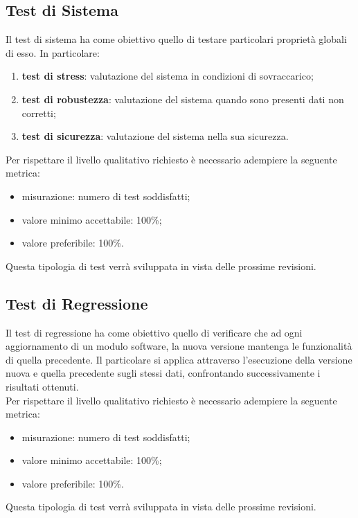 \subsection{Test di Sistema}
Il test di sistema ha come obiettivo quello di testare particolari proprietà globali di esso. In particolare:
\begin{enumerate}
	\item \textbf{test di stress}: valutazione del sistema in condizioni di sovraccarico;
	\item \textbf{test di robustezza}: valutazione del sistema quando sono presenti dati non corretti;
	\item \textbf{test di sicurezza}: valutazione del sistema nella sua sicurezza.
\end{enumerate}
Per rispettare il livello qualitativo richiesto è necessario adempiere la seguente metrica:
\begin{itemize}
\item misurazione: numero di test soddisfatti;
\item valore minimo accettabile: 100\%;
\item valore preferibile: 100\%.
\end{itemize}
Questa tipologia di test verrà sviluppata in vista delle prossime revisioni.


\subsection{Test di Regressione}
Il test di regressione ha come obiettivo quello di verificare che ad ogni aggiornamento di un modulo software, la nuova versione mantenga le funzionalità di quella precedente.
Il particolare si applica attraverso l'esecuzione della versione nuova e quella precedente sugli stessi dati, confrontando successivamente i risultati ottenuti.\\
Per rispettare il livello qualitativo richiesto è necessario adempiere la seguente metrica:
\begin{itemize}
	\item misurazione: numero di test soddisfatti;
	\item valore minimo accettabile: 100\%;
	\item valore preferibile: 100\%.
\end{itemize}
Questa tipologia di test verrà sviluppata in vista delle prossime revisioni.